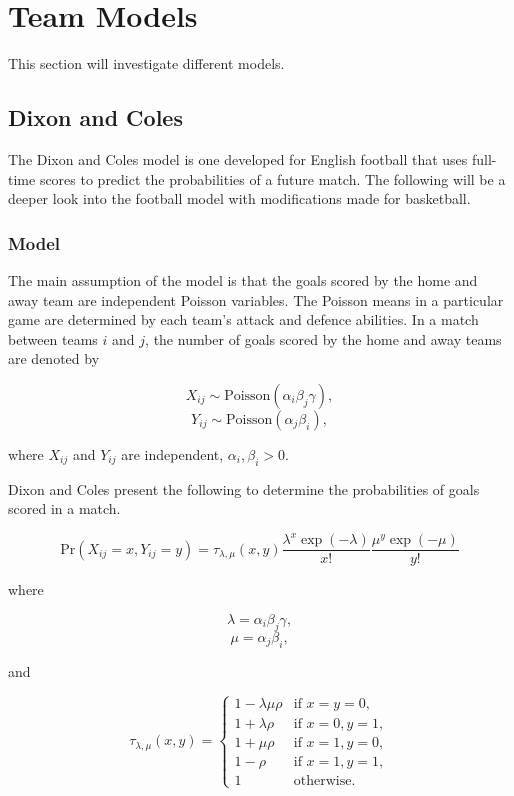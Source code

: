 \chapter{Team Models}\label{chapter:team_model}

This section will investigate different models.

\section{Dixon and Coles}
The Dixon and Coles model is one developed for English football that uses full-time scores to predict the probabilities of a future match.  The following will be a deeper look into the football model with modifications made for basketball.

\subsection{Model}

The main assumption of the model is that the goals scored by the home and away team are independent Poisson variables.  The Poisson means in a particular game are determined by each team's attack and defence abilities.   In a match between teams $i$ and $j$, the number of goals scored by the home and away teams are denoted by

$$X_{ij} \sim \text{Poisson}(\alpha_i\beta_j\gamma),$$
$$Y_{ij} \sim \text{Poisson}(\alpha_j\beta_i),$$

where $X_{ij}$ and $Y_{ij}$ are independent, $\alpha_i, \beta_i > 0.$

Dixon and Coles present the following to determine the probabilities of goals scored in a match.

\begin{equation}\label{eq:base_dc}
\text{Pr}(X_{ij}=x, Y_{ij} = y) = \tau_{\lambda,\mu}(x, y)\frac{\lambda^x\exp(-\lambda)}{x!}\frac{\mu^y\exp(-\mu)}{y!}
\end{equation}

where

$$\lambda = \alpha_i\beta_j\gamma,$$
$$\mu = \alpha_j\beta_i,$$

and

\[
	\tau_{\lambda,\mu}(x,y) = 
	\begin{cases}
		1 - \lambda \mu \rho & \text{if } x=y=0,\\
		1 + \lambda \rho & \text{if } x=0,y=1,\\
		1 + \mu \rho & \text{if } x=1,y=0,\\
		1 - \rho & \text{if } x=1,y=1,\\
		1 & \text{otherwise}.
	\end{cases}
\]	



